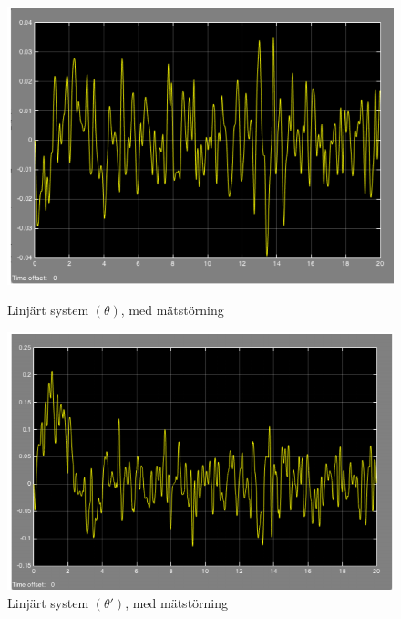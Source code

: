 \documentclass[11pt]{article}
\begin{document}
\begin{figure}[h!]
\centering
\includegraphics[scale=0.9]{Figures/simlink_3}
\caption{Linjärt system $(\theta)$, med mätstörning}
\vspace{3em}
\includegraphics[scale=0.9]{Figures/simlink_4}
\caption{Linjärt system $(\theta \prime)$, med mätstörning}
\end{figure}
\newpage
\end{document}
